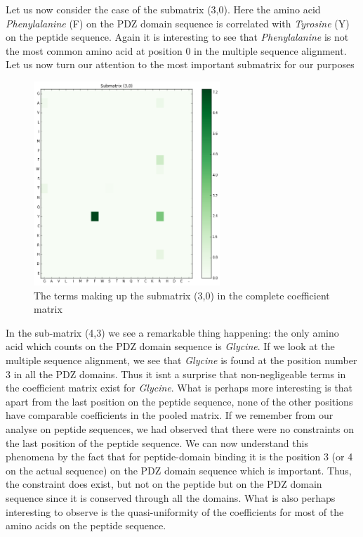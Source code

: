 \documentclass[a4paper, 12pt]{article}
\begin{document}
\begin{enumerate}
Let us now consider the case of the submatrix (3,0). Here the amino acid \emph{Phenylalanine} (F) on the PDZ domain sequence is correlated with \emph{Tyrosine} (Y) on the peptide sequence. Again it is interesting to see that \emph{Phenylalanine} is not the most common amino acid at position 0 in the multiple sequence alignment. Let us now turn our attention to the most important submatrix for our purposes

\begin{figure}[!h]
\centering
\label{submatrix_30}
\includegraphics[width=7cm]{Images/submatrix_30.png}
\caption{The terms making up the submatrix (3,0) in the complete coefficient matrix}
\end{figure}

In the sub-matrix (4,3) we see a remarkable thing happening: the only amino acid which counts on the PDZ domain sequence is \emph{Glycine}. If we look at the multiple sequence alignment, we see that \emph{Glycine} is found at the position number 3 in all the PDZ domains. Thus it isnt a surprise that non-negligeable terms in the coefficient matrix exist for \emph{Glycine}. What is perhaps more interesting is that apart from the last position on the peptide sequence, none of the other positions have comparable coefficients in the pooled matrix. If we remember from our analyse on peptide sequences, we had observed that there were no constraints on the last position of the peptide sequence. We can now understand this phenomena by the fact that for peptide-domain binding it is the position 3 (or 4 on the actual sequence) on the PDZ domain sequence which is important. Thus, the constraint does exist, but not on the peptide but on the PDZ domain sequence since it is conserved through all the domains. What is also perhaps interesting to observe is the quasi-uniformity of the coefficients for most of the amino acids on the peptide sequence. 


\end{enumerate}
\end{document}
